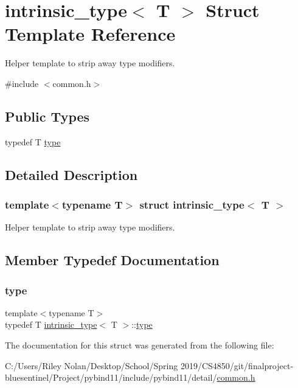 \hypertarget{structintrinsic__type}{}\section{intrinsic\+\_\+type$<$ T $>$ Struct Template Reference}
\label{structintrinsic__type}


Helper template to strip away type modifiers.  




{\ttfamily \#include $<$common.\+h$>$}

\subsection*{Public Types}
\begin{DoxyCompactItemize}
\item 
typedef T \mbox{\hyperlink{structintrinsic__type_ab90beb94ea8a923b5435bf0011bc926f}{type}}
\end{DoxyCompactItemize}


\subsection{Detailed Description}
\subsubsection*{template$<$typename T$>$\newline
struct intrinsic\+\_\+type$<$ T $>$}

Helper template to strip away type modifiers. 

\subsection{Member Typedef Documentation}
\mbox{\label{structintrinsic__type_ab90beb94ea8a923b5435bf0011bc926f}} 
\subsubsection{\texorpdfstring{type}{type}}
{\footnotesize\ttfamily template$<$typename T$>$ \\
typedef T \mbox{\hyperlink{structintrinsic__type}{intrinsic\+\_\+type}}$<$ T $>$\+::\mbox{\hyperlink{structintrinsic__type_ab90beb94ea8a923b5435bf0011bc926f}{type}}}



The documentation for this struct was generated from the following file\+:\begin{DoxyCompactItemize}
\item 
C\+:/\+Users/\+Riley Nolan/\+Desktop/\+School/\+Spring 2019/\+C\+S4850/git/finalproject-\/bluesentinel/\+Project/pybind11/include/pybind11/detail/\mbox{\hyperlink{detail_2common_8h}{common.\+h}}\end{DoxyCompactItemize}
